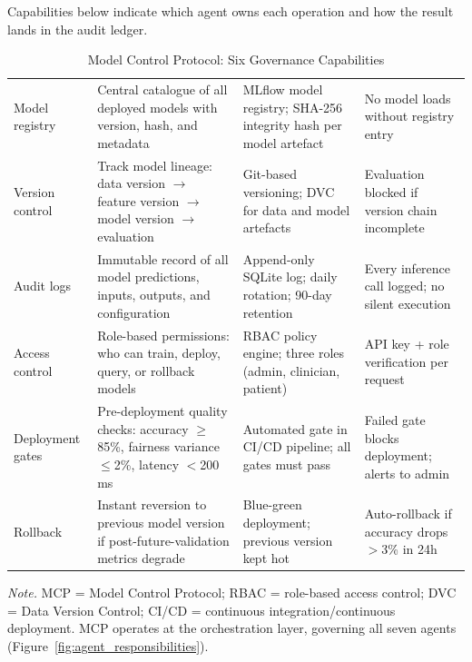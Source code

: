 \noindent Capabilities below indicate which agent owns each operation and how the result lands in the audit ledger.
{\tablestripes\tablefontsize
{}
\begin{xltabular}{\textwidth}{@{} >{\raggedright\arraybackslash}p{2cm} p{4.7cm} p{4.0cm} >{\raggedright\arraybackslash}p{3.5cm} @{}}
\caption[Model Control Protocol]{Model Control Protocol: Six Governance Capabilities}\label{tab:app_mcp_capabilities} \\
\toprule
{} &  &  &  \\
\midrule
\endfirsthead
\endhead
\bottomrule
\endlastfoot
Model registry & Central catalogue of all deployed models with version, hash, and metadata & MLflow model registry; SHA-256 integrity hash per model artefact & No model loads without registry entry \\
\addlinespace
Version control & Track model lineage: data version $\to$ feature version $\to$ model version $\to$ evaluation & Git-based versioning; DVC for data and model artefacts & Evaluation blocked if version chain incomplete \\
\addlinespace
Audit logs & Immutable record of all model predictions, inputs, outputs, and configuration & Append-only SQLite log; daily rotation; 90-day retention & Every inference call logged; no silent execution \\
\addlinespace
Access control & Role-based permissions: who can train, deploy, query, or rollback models & RBAC policy engine; three roles (admin, clinician, patient) & API key + role verification per request \\
\addlinespace
Deployment gates & Pre-deployment quality checks: accuracy $\geq$85\%, fairness variance $\leq$2\%, latency $<$200\,ms & Automated gate in CI/CD pipeline; all gates must pass & Failed gate blocks deployment; alerts to admin \\
\addlinespace
Rollback & Instant reversion to previous model version if post-future-validation metrics degrade & Blue-green deployment; previous version kept hot & Auto-rollback if accuracy drops $>$3\% in 24h \\
\end{xltabular}}
\vspace{0.5em}\noindent\textit{Note.} MCP = Model Control Protocol; RBAC = role-based access control; DVC = Data Version Control; CI/CD = continuous integration/continuous deployment. MCP operates at the orchestration layer, governing all seven agents (Figure~\ref{fig:agent_responsibilities}).

